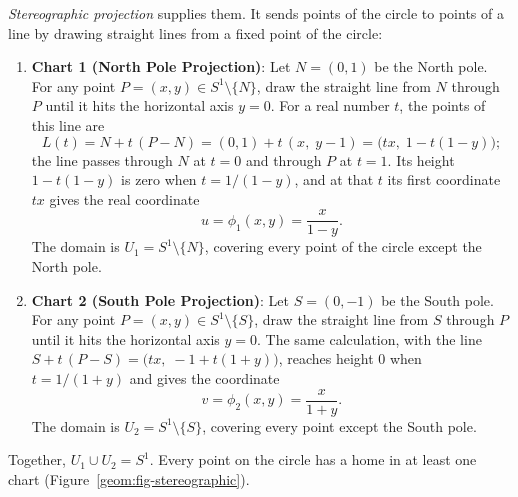 \emph{Stereographic projection} supplies them. It sends points of the circle to points of a line by drawing straight lines from a fixed point of the circle:
\begin{enumerate}
  \item \textbf{Chart 1 (North Pole Projection)}: Let $N = (0, 1)$ be the North pole. For any point $P = (x, y) \in S^1 \setminus \{N\}$, draw the straight line from $N$ through $P$ until it hits the horizontal axis $y = 0$. For a real number $t$, the points of this line are
  \[
  L(t) = N + t\,(P - N) = (0, 1) + t\,(x,\; y - 1) = \bigl(tx,\; 1 - t(1 - y)\bigr);
  \]
  the line passes through $N$ at $t = 0$ and through $P$ at $t = 1$. Its height $1 - t(1 - y)$ is zero when $t = 1/(1-y)$, and at that $t$ its first coordinate $tx$ gives the real coordinate
  \[
  u = \phi_1(x, y) = \frac{x}{1-y}.
  \]
  The domain is $U_1 = S^1 \setminus \{N\}$, covering every point of the circle except the North pole.
  \item \textbf{Chart 2 (South Pole Projection)}: Let $S = (0, -1)$ be the South pole. For any point $P = (x, y) \in S^1 \setminus \{S\}$, draw the straight line from $S$ through $P$ until it hits the horizontal axis $y = 0$. The same calculation, with the line $S + t\,(P - S) = \bigl(tx,\; -1 + t(1 + y)\bigr)$, reaches height $0$ when $t = 1/(1+y)$ and gives the coordinate
  \[
  v = \phi_2(x, y) = \frac{x}{1+y}.
  \]
  The domain is $U_2 = S^1 \setminus \{S\}$, covering every point except the South pole.
\end{enumerate}
Together, $U_1 \cup U_2 = S^1$. Every point on the circle has a home in at least one chart (Figure~\ref{geom:fig-stereographic}).


